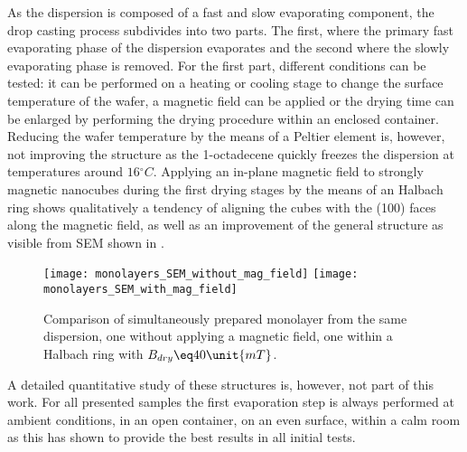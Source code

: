 \documentclass[\main/dresen_thesis.tex]{subfiles}
\begin{document}
  As the dispersion is composed of a fast and slow evaporating component, the drop casting process subdivides into two parts.
  The first, where the primary fast evaporating phase of the dispersion evaporates and the second where the slowly evaporating phase is removed.
  For the first part, different conditions can be tested: it can be performed on a heating or cooling stage to change the surface temperature of the wafer, a magnetic field can be applied or the drying time can be enlarged by performing the drying procedure within an enclosed container.
  Reducing the wafer temperature by the means of a Peltier element is, however, not improving the structure as the 1-octadecene quickly freezes the dispersion at temperatures around $16 \unit{^\circ C}$.
  Applying an in-plane magnetic field to strongly magnetic nanocubes during the first drying stages by the means of an Halbach ring shows qualitatively a tendency of aligning the cubes with the (100) faces along the magnetic field, as well as an improvement of the general structure as visible from SEM shown in .
  \begin{figure}[tb]
    \centering
    \texttt{[image: monolayers\_SEM\_without\_mag\_field]}
    \texttt{[image: monolayers\_SEM\_with\_mag\_field]}
    \caption{\label{fig:monolayers:preparation:dryingConditions:magneticField}Comparison of simultaneously prepared monolayer from the same dispersion, one without applying a magnetic field, one within a Halbach ring with $B_{dry} \eq 40 \unit{mT}$.}
  \end{figure}
  A detailed quantitative study of these structures is, however, not part of this work.
  For all presented samples the first evaporation step is always performed at ambient conditions, in an open container, on an even surface, within a calm room as this has shown to provide the best results in all initial tests.
\end{document}
